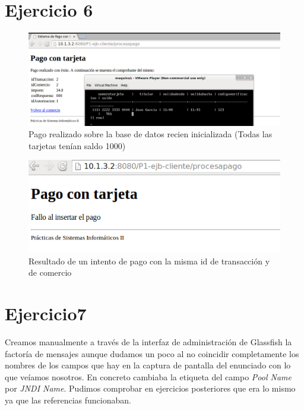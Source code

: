 \documentclass[a4paper, 10pt]{article}
\begin{document}
\pagebreak
 


\section{Ejercicio 6}
	\begin{figure}[htbp]
		\centering	
		\includegraphics[width=1\textwidth]{pantallazos/ejercicio6a.png}
		\caption{Pago realizado sobre la base de datos recien inicializada (Todas las tarjetas tenían saldo 1000)}
	\end{figure}
 	
 	\begin{figure}[htbp]
		\centering	
		\includegraphics[width=1\textwidth]{pantallazos/ejercicio6b.png}
		\caption{Resultado de un intento de pago con la misma id de transacción y de comercio}
	\end{figure}



\section{Ejercicio7}
	Creamos manualmente a través de la interfaz de administración de Glassfish la factoría de mensajes aunque dudamos un poco al no coincidir completamente los nombres de los campos que hay en la captura de pantalla del enunciado con lo que veíamos nosotros. En concreto cambiaba la etiqueta del campo \textit{Pool Name} por \textit{JNDI Name}. Pudimos comprobar en ejercicios posteriores que era lo mismo ya que las referencias funcionaban.
\end{document}
